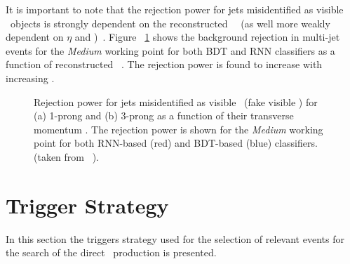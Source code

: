 It is important to note that the rejection power for jets misidentified as visible \htau\ objects is strongly dependent on the reconstructed \htau\ \pt\ (as well more weakly dependent on $\eta$ and \mubar)~\cite{ATL-PHYS-PUB-2019-033}. 
Figure ~\ref{fig:BDT_RNN_rejection_power} shows the background rejection in multi-jet events for the \textit{Medium} working point for both \ac{BDT} and \ac{RNN} classifiers as a function of reconstructed \htau\ \pt. The rejection power is found to increase with increasing \pt. 
	\begin{figure}[!htb]
		\begin{center}
			\hspace{0.05\textwidth}
			\hspace{0.05\textwidth}
		\end{center}
		\caption{Rejection power for jets misidentified as visible \htau\ (fake visible \htau) for (a) 1-prong and (b) 3-prong as a function of their transverse momentum \pt. The rejection power is shown for the \textit{Medium} working point for both \ac{RNN}-based (red) and \ac{BDT}-based (blue) classifiers. (taken from ~\cite{ATL-PHYS-PUB-2019-033}).}
		\label{fig:BDT_RNN_rejection_power}
	\end{figure}

	\section{Trigger Strategy} 
	\label{sec:anatrig}
	In this section the triggers strategy used for the selection of relevant events for the search of the direct \stau\ production is presented. 
	
